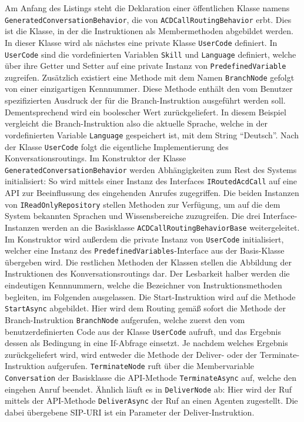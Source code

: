 \noindent Am Anfang des Listings steht die Deklaration einer öffentlichen Klasse namens \texttt{GeneratedConversationBehavior}, die von \texttt{ACDCallRoutingBehavior} erbt. Dies ist die Klasse, in der die Instruktionen als Membermethoden abgebildet werden. In dieser Klasse wird als nächstes eine private Klasse \texttt{UserCode} definiert. In \texttt{UserCode} sind die vordefinierten Variablen \texttt{Skill} und \texttt{Language} definiert, welche über ihre Getter und Setter auf eine private Instanz von \texttt{PredefinedVariable} zugreifen. Zusätzlich existiert eine Methode mit dem Namen \texttt{BranchNode} gefolgt von einer einzigartigen Kennnummer. Diese Methode enthält den vom Benutzer spezifizierten Ausdruck der für die Branch-Instruktion ausgeführt werden soll. Dementsprechend wird ein boolescher Wert zurückgeliefert. In diesem Beispiel vergleicht die Branch-Instruktion also die aktuelle Sprache, welche in der vordefinierten Variable \texttt{Language} gespeichert ist, mit dem String ``Deutsch''. 
\newline
Nach der Klasse \texttt{UserCode} folgt die eigentliche Implementierung des Konversationsroutings. Im Konstruktor der Klasse \texttt{GeneratedConversationBehavior} werden Abhängigkeiten zum Rest des Systems initialisiert: So wird mittels einer Instanz des Interfaces \texttt{IRoutedAcdCall} auf eine API zur Beeinflussung des eingehenden Anrufes zugegriffen. Die beiden Instanzen von \texttt{IReadOnlyRepository} stellen Methoden zur Verfügung, um auf die dem System bekannten Sprachen und Wissensbereiche zuzugreifen. Die drei Interface-Instanzen werden an die Basisklasse \texttt{ACDCallRoutingBehaviorBase} weitergeleitet. Im Konstruktor wird außerdem die private Instanz von \texttt{UserCode} initialisiert, welcher eine Instanz des \texttt{PredefinedVariables}-Interface aus der Basis-Klasse übergeben wird. Die restlichen Methoden der Klassen stellen die Abbildung der Instruktionen des Konversationsroutings dar. Der Lesbarkeit halber werden die eindeutigen Kennnummern, welche die Bezeichner von Instruktionsmethoden begleiten, im Folgenden ausgelassen. Die Start-Instruktion wird auf die Methode \texttt{StartAsync} abgebildet. Hier wird dem Routing gemäß sofort die Methode der Branch-Instruktion \texttt{BranchNode} aufgerufen, welche zuerst den vom benutzerdefinierten Code aus der Klasse \texttt{UserCode} aufruft, und das Ergebnis dessen als Bedingung in eine If-Abfrage einsetzt. Je nachdem welches Ergebnis zurückgeliefert wird, wird entweder die Methode der Deliver- oder der Terminate-Instruktion aufgerufen. \texttt{TerminateNode} ruft über die Membervariable \texttt{Conversation} der Basisklasse die API-Methode \texttt{TerminateAsync} auf, welche den eingehen Anruf beendet. Ähnlich läuft es in \texttt{DeliverNode} ab: Hier wird der Ruf mittels der API-Methode \texttt{DeliverAsync} der Ruf an einen Agenten zugestellt. Die dabei übergebene SIP-URI ist ein Parameter der Deliver-Instruktion.

